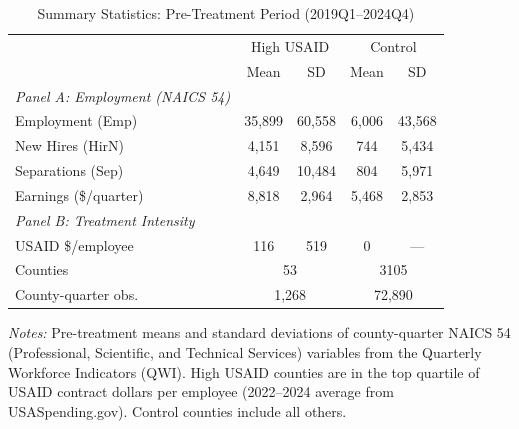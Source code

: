 
\begin{table}[t]
\centering
\caption{Summary Statistics: Pre-Treatment Period (2019Q1--2024Q4)}
\label{tab:summary}
\begin{tabular}{lcccc}
\hline\hline
 & \multicolumn{2}{c}{High USAID} & \multicolumn{2}{c}{Control} \\
 & Mean & SD & Mean & SD \\
\hline
\textit{Panel A: Employment (NAICS 54)} & & & & \\
\quad Employment (Emp) & 35,899 & 60,558 & 6,006 & 43,568 \\
\quad New Hires (HirN) & 4,151 & 8,596 & 744 & 5,434 \\
\quad Separations (Sep) & 4,649 & 10,484 & 804 & 5,971 \\
\quad Earnings (\$/quarter) & 8,818 & 2,964 & 5,468 & 2,853 \\[4pt]
\textit{Panel B: Treatment Intensity} & & & & \\
\quad USAID \$/employee & 116 & 519 & 0 & --- \\
\quad Counties & \multicolumn{2}{c}{53} & \multicolumn{2}{c}{3105} \\
\quad County-quarter obs. & \multicolumn{2}{c}{1,268} & \multicolumn{2}{c}{72,890} \\
\hline\hline
\end{tabular}
\begin{tablenotes}
\item \textit{Notes:} Pre-treatment means and standard deviations of county-quarter NAICS 54
(Professional, Scientific, and Technical Services) variables from the Quarterly Workforce
Indicators (QWI). High USAID counties are in the top quartile of USAID contract dollars per
employee (2022--2024 average from USASpending.gov). Control counties include all others.
\end{tablenotes}
\end{table}

